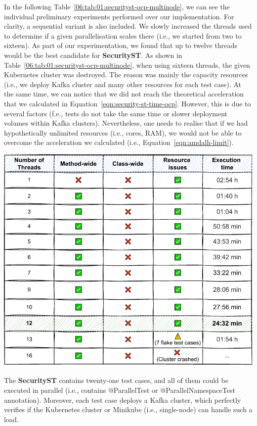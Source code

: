 In the following Table~\ref{06:tab:01:securityst-ocp-multinode}, we can see the individual preliminary experiments performed over our implementation.
For clarity, a sequential variant is also included.
We slowly increased the threads used to determine if a given parallelisation scales there (i.e., we started from two to sixteen).
As part of our experimentation, we found that up to twelve threads would be the best candidate for \textbf{SecurityST}.
As shown in Table~\ref{06:tab:01:securityst-ocp-multinode}, when using sixteen threads, the given Kubernetes cluster was destroyed.
The reason was mainly the capacity resources (i.e., we deploy Kafka cluster and many other resources for each test case).
At the same time, we can notice that we did not reach the theoretical acceleration that we calculated in Equation~\eqref{eqn:security-st-time-ocp}.
However, this is due to several factors (f.e., tests do not take the same time or slower deployment volumes within Kafka clusters).
Nevertheless, one needs to realise that if we had hypothetically unlimited resources (i.e., cores, RAM), we would not be able to overcome
the acceleration we calculated (i.e., Equation~\eqref{eqn:amdalh-limit}).
\begin{table}[ht!]
    \centering
    \includegraphics[scale=0.8]{obrazky-figures/08-experiments/preliminary/06-exp-final-smoke-method-wide-ocp}
    \caption{The \textbf{SecurityST} contains twenty-one test cases, and all of them could be executed in parallel
        (i.e., contains @ParallelTest or @ParallelNamespaceTest annotation).
        Moreover, each test case deploys a Kafka cluster, which perfectly verifies if the Kubernetes cluster
        or Minikube (i.e., single-node) can handle such a load.}
    \label{06:tab:01:securityst-ocp-multinode}
\end{table}

